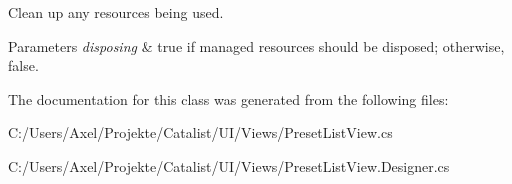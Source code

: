 Clean up any resources being used. 


\begin{DoxyParams}{Parameters}
{\em disposing} & true if managed resources should be disposed; otherwise, false.\\
\hline
\end{DoxyParams}


The documentation for this class was generated from the following files\+:\begin{DoxyCompactItemize}
\item 
C\+:/\+Users/\+Axel/\+Projekte/\+Catalist/\+U\+I/\+Views/Preset\+List\+View.\+cs\item 
C\+:/\+Users/\+Axel/\+Projekte/\+Catalist/\+U\+I/\+Views/Preset\+List\+View.\+Designer.\+cs\end{DoxyCompactItemize}
